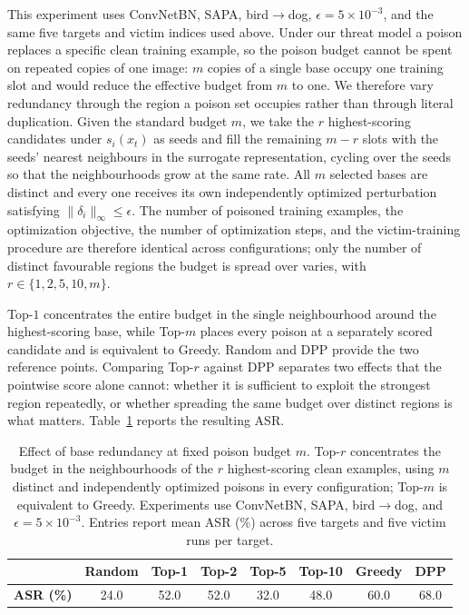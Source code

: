 This experiment uses ConvNetBN, SAPA, bird$\rightarrow$dog,
$\epsilon=5\times10^{-3}$, and the same five targets and victim indices
used above. Under our threat model a poison replaces a specific clean
training example, so the poison budget cannot be spent on repeated copies
of one image: $m$ copies of a single base occupy one training slot and
would reduce the effective budget from $m$ to one. We therefore vary
redundancy through the region a poison set occupies rather than through
literal duplication. Given the standard budget $m$, we take the $r$
highest-scoring candidates under $s_i(x_t)$ as seeds and fill the
remaining $m-r$ slots with the seeds' nearest neighbours in the surrogate
representation, cycling over the seeds so that the neighbourhoods grow at
the same rate. All $m$ selected bases are distinct and every one receives
its own independently optimized perturbation satisfying
$\|\delta_i\|_\infty\leq\epsilon$. The number of poisoned training
examples, the optimization objective, the number of optimization steps,
and the victim-training procedure are therefore identical across
configurations; only the number of distinct favourable regions the budget
is spread over varies, with $r\in\{1,2,5,10,m\}$.

Top-$1$ concentrates the entire budget in the single neighbourhood
around the highest-scoring base, while Top-$m$ places every poison at a
separately scored candidate and is equivalent to Greedy. Random and DPP
provide the two reference points. Comparing Top-$r$ against DPP separates
two effects that the pointwise score alone cannot: whether it is
sufficient to exploit the strongest region repeatedly, or whether
spreading the same budget over distinct regions is what matters.
Table~\ref{tab:base-redundancy} reports the resulting ASR.

\begin{table}[t]
\centering
\caption{
Effect of base redundancy at fixed poison budget $m$. Top-$r$ concentrates
the budget in the neighbourhoods of the $r$ highest-scoring clean
examples, using $m$ distinct and independently optimized poisons in every
configuration; Top-$m$ is equivalent to Greedy. Experiments use
ConvNetBN, SAPA, bird$\rightarrow$dog, and
$\epsilon=5\times10^{-3}$. Entries report mean ASR (\%) across five
targets and five victim runs per target.
}
\label{tab:base-redundancy}
\small
\setlength{\tabcolsep}{6pt}
\renewcommand{\arraystretch}{1.08}
\begin{tabular}{c|ccccccc}
\toprule
&
\textbf{Random} &
\textbf{Top-1} &
\textbf{Top-2} &
\textbf{Top-5} &
\textbf{Top-10} &
\textbf{Greedy} &
\textbf{DPP} \\
\midrule
\textbf{ASR (\%)} &
 24.0 & 52.0 & 52.0 & 32.0 & 48.0 & 60.0 & 68.0 \\
\bottomrule
\end{tabular}
\end{table}


